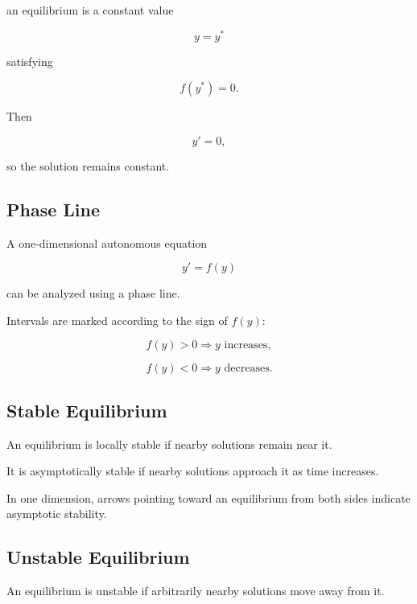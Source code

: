 an equilibrium is a constant value

\[
\boxed{
y=y^*
}
\]

satisfying

\[
\boxed{
f(y^*)=0.
}
\]

Then

\[
y'=0,
\]

so the solution remains constant.

\subsection{Phase Line}
\label{subsec:phase-line}

A one-dimensional autonomous equation

\[
y'=f(y)
\]

can be analyzed using a phase line.

Intervals are marked according to the sign of \(f(y)\):

\[
\boxed{
f(y)>0
\Rightarrow
y\text{ increases},
}
\]

\[
\boxed{
f(y)<0
\Rightarrow
y\text{ decreases}.
}
\]

\subsection{Stable Equilibrium}
\label{subsec:stable-equilibrium-one-dimensional}

An equilibrium is locally stable if nearby solutions remain near it.

It is asymptotically stable if nearby solutions approach it as time
increases.

In one dimension, arrows pointing toward an equilibrium from both sides
indicate asymptotic stability.

\subsection{Unstable Equilibrium}
\label{subsec:unstable-equilibrium-one-dimensional}

An equilibrium is unstable if arbitrarily nearby solutions move away from
it.

